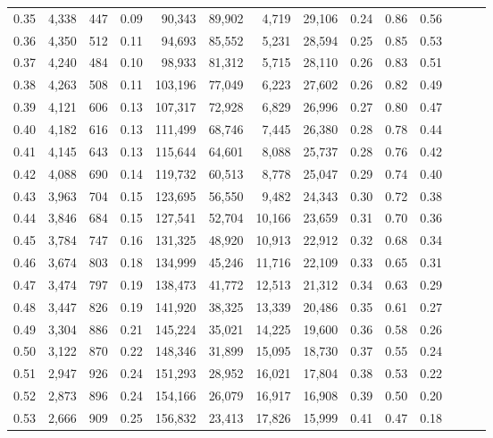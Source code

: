 \begin{tabular}{rrrrrrrrrrrrrr}
0.35 &  4,338 &  447 &  0.09 &   90,343 &   89,902 &   4,719 &  29,106 &  0.24 &  0.86 &      0.56 \\
0.36 &  4,350 &  512 &  0.11 &   94,693 &   85,552 &   5,231 &  28,594 &  0.25 &  0.85 &      0.53 \\
0.37 &  4,240 &  484 &  0.10 &   98,933 &   81,312 &   5,715 &  28,110 &  0.26 &  0.83 &      0.51 \\
0.38 &  4,263 &  508 &  0.11 &  103,196 &   77,049 &   6,223 &  27,602 &  0.26 &  0.82 &      0.49 \\
0.39 &  4,121 &  606 &  0.13 &  107,317 &   72,928 &   6,829 &  26,996 &  0.27 &  0.80 &      0.47 \\
0.40 &  4,182 &  616 &  0.13 &  111,499 &   68,746 &   7,445 &  26,380 &  0.28 &  0.78 &      0.44 \\
0.41 &  4,145 &  643 &  0.13 &  115,644 &   64,601 &   8,088 &  25,737 &  0.28 &  0.76 &      0.42 \\
0.42 &  4,088 &  690 &  0.14 &  119,732 &   60,513 &   8,778 &  25,047 &  0.29 &  0.74 &      0.40 \\
0.43 &  3,963 &  704 &  0.15 &  123,695 &   56,550 &   9,482 &  24,343 &  0.30 &  0.72 &      0.38 \\
0.44 &  3,846 &  684 &  0.15 &  127,541 &   52,704 &  10,166 &  23,659 &  0.31 &  0.70 &      0.36 \\
0.45 &  3,784 &  747 &  0.16 &  131,325 &   48,920 &  10,913 &  22,912 &  0.32 &  0.68 &      0.34 \\
0.46 &  3,674 &  803 &  0.18 &  134,999 &   45,246 &  11,716 &  22,109 &  0.33 &  0.65 &      0.31 \\
0.47 &  3,474 &  797 &  0.19 &  138,473 &   41,772 &  12,513 &  21,312 &  0.34 &  0.63 &      0.29 \\
0.48 &  3,447 &  826 &  0.19 &  141,920 &   38,325 &  13,339 &  20,486 &  0.35 &  0.61 &      0.27 \\
0.49 &  3,304 &  886 &  0.21 &  145,224 &   35,021 &  14,225 &  19,600 &  0.36 &  0.58 &      0.26 \\
0.50 &  3,122 &  870 &  0.22 &  148,346 &   31,899 &  15,095 &  18,730 &  0.37 &  0.55 &      0.24 \\
0.51 &  2,947 &  926 &  0.24 &  151,293 &   28,952 &  16,021 &  17,804 &  0.38 &  0.53 &      0.22 \\
0.52 &  2,873 &  896 &  0.24 &  154,166 &   26,079 &  16,917 &  16,908 &  0.39 &  0.50 &      0.20 \\
0.53 &  2,666 &  909 &  0.25 &  156,832 &   23,413 &  17,826 &  15,999 &  0.41 &  0.47 &      0.18 \\

\end{tabular}
